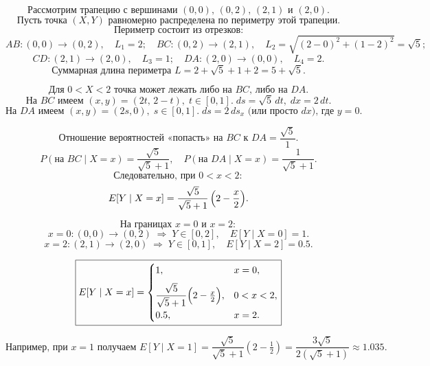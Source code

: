 \documentclass{article}
\begin{document}
\[
\textbf{Рассмотрим трапецию с вершинами }(0,0),\,(0,2),\,(2,1)\text{ и }(2,0).
\]
\[
\text{Пусть точка }(X,Y)\text{ равномерно распределена по периметру этой трапеции.}
\]
\[
\text{Периметр состоит из отрезков:}
\]
\[
AB: (0,0)\to (0,2),\quad L_1 = 2;
\quad BC: (0,2)\to (2,1),\quad L_2 = \sqrt{(2-0)^2 + (1-2)^2}=\sqrt{5};
\]
\[
CD: (2,1)\to(2,0),\quad L_3=1;
\quad DA: (2,0)\to(0,0),\quad L_4=2.
\]
\[
\text{Суммарная длина периметра }L = 2 + \sqrt{5} + 1 + 2 = 5 + \sqrt{5}.
\]

\[
\text{Для }0 < X < 2\text{ точка может лежать либо на }BC\text{, либо на }DA.
\]
\[
\text{На }BC\text{ имеем }(x,y)=(2t,\,2-t),\;t\in[0,1].\;
ds=\sqrt{5}\,dt,\;dx=2\,dt.
\]
\[
\text{На }DA\text{ имеем }(x,y)=(2s,0),\;s\in[0,1].\;
ds=2\,ds_x \text{ (или просто }dx\text{), где }y=0.
\]

\[
\text{Отношение вероятностей «попасть» на }BC\text{ к }DA
= \frac{\sqrt{5}}{1}.
\]
\[
P(\text{на }BC\mid X=x)
= \frac{\sqrt{5}}{\sqrt{5}+1},\quad
P(\text{на }DA\mid X=x)
= \frac{1}{\sqrt{5}+1}.
\]
\[
\text{Следовательно, при }0<x<2:
\]
\[
E[Y\mid X=x]
= \frac{\sqrt{5}}{\sqrt{5}+1}\,\Bigl(2 - \frac{x}{2}\Bigr).
\]

\[
\text{На границах }x=0 \text{ и } x=2:
\]
\[
x=0\colon (0,0)\to(0,2)\;\Longrightarrow\;Y\in[0,2],
\quad E[Y\mid X=0] = 1.
\]
\[
x=2\colon (2,1)\to(2,0)\;\Longrightarrow\;Y\in[0,1],
\quad E[Y\mid X=2] = 0.5.
\]

\[
\boxed{
E[Y\mid X=x] =
\begin{cases}
1, & x=0,\\[6pt]
\dfrac{\sqrt{5}}{\sqrt{5}+1}\Bigl(2 - \tfrac{x}{2}\Bigr), & 0<x<2,\\[6pt]
0.5, & x=2.
\end{cases}
}
\]

\[
\text{Например, при }x=1\text{ получаем }
E[Y\mid X=1]
= \frac{\sqrt{5}}{\sqrt{5}+1}\left(2 - \tfrac12\right)
= \frac{3\sqrt{5}}{2(\sqrt{5}+1)} \approx 1.035.
\]
\end{document}
